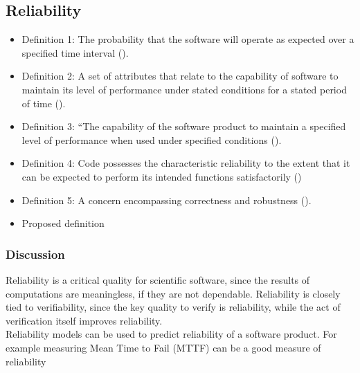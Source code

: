\documentclass[letterpaper,cleveref]{lipics-v2019}
\theoremstyle{definition}
\begin{document}
\subsection{Reliability}
\begin{itemize}
	\item{Definition 1:} The probability that the software will operate as expected over a specified time interval (\cite{GhezziEtAl2003}).\\
	\item{Definition 2:} A set of attributes that relate to the capability of software to maintain its level of performance under stated conditions for a stated period of time (\cite{berander2005software}).\\
	\item{Definition 3:} “The capability of the software product to maintain a specified level of performance when used under specified conditions (\cite{international2001iso}).\\
	\item{Definition 4:} Code possesses the characteristic reliability to the extent that it can be expected to perform its intended functions satisfactorily (\cite{boehm2007software})\\
	\item{Definition 5:} A concern encompassing correctness and robustness (\cite{meyer1988object}).\\
	\item{Proposed definition}\\
\end{itemize}

\subsubsection{Discussion}
Reliability is a critical quality for scientific software, since the results of
computations are meaningless, if they are not dependable.  Reliability is
closely tied to verifiability, since the key quality to verify is reliability,
while the act of verification itself improves reliability.\\
Reliability models can be used to predict reliability of a software product. For example measuring Mean Time to Fail (MTTF) can be a good measure of reliability \cite{berander2005software}
\end{document}
